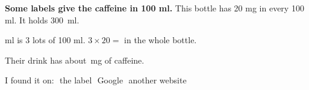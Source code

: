 \documentclass[12pt,a4paper]{article}
\newif\iffr
\newcommand{\fr}[1]{\unskip\iffr\par\nobreak\vspace{1pt}\noindent{\small\itshape\color{black!60}#1}\par\fi}
\newcommand{\mg}[1][1.8cm]{\blank[#1]\,mg}
\newcommand{\choice}[1]{\tickbox\,\,#1}
\begin{document}
\noindent\begin{minipage}{\linewidth}
\noindent\textbf{Some labels give the caffeine in 100 ml.} This bottle has
20 mg in every 100 ml. It holds 300~ml.
\fr{Certaines \'etiquettes donnent la caf\'eine pour 100~ml. Cette bouteille
contient 20~mg pour 100~ml, et elle fait 300~ml en tout.}

\vspace{3pt}
 ml is 3 lots of 100 ml. \qquad $3 \times 20 =$  in the
whole bottle.
\fr{300~ml, c'est 3 fois 100~ml (\eng{3 lots of 100 ml})~: il y a donc 60~mg
dans toute la bouteille.}

\vspace{3pt}
\fr{Une canette de 330~ml~? Fais $330 \div 100 = 3.3$, puis
$3.3 \times 20 = 66$~mg. Ou cherche sur Google la caf\'eine de toute la
canette.}

\vspace{12pt}
\noindent Their drink has about \mg[2.2cm] of caffeine.
\fr{Sa boisson contient environ \ldots\ mg de caf\'eine.}

\vspace{10pt}
\noindent I found it on: \quad \choice{the label} \quad\;
\choice{Google} \quad\; \choice{another website}
\fr{Je l'ai trouv\'e sur~: l'\'etiquette, Google ou un autre site web.}
\end{minipage}
\end{document}
